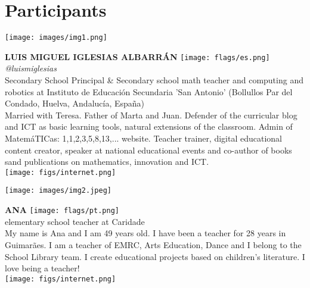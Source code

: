 \section*{Participants}
\noindent
\begin{minipage}{0.3\textwidth}
\centering
\texttt{[image: images/img1.png]}
\end{minipage}
\hfill
\begin{minipage}{0.6\textwidth}\raggedright
\color{color1}\uppercase{\textbf{Luis Miguel Iglesias Albarrán}}
\color{color2}\hspace{0.2cm}\texttt{[image: flags/es.png]}
\hspace{0.2cm}\textit{@luismiglesias}
\\
Secondary School Principal \& Secondary school math teacher and computing and robotics at Instituto de Educación Secundaria 'San Antonio' (Bollullos Par del Condado, Huelva, Andalucía, España)\\
{\footnotesize Married with Teresa. Father of Marta and Juan. Defender of the curricular blog and ICT as basic learning tools, natural extensions of the classroom. Admin of MatemáTICas: 1,1,2,3,5,8,13,... website. Teacher trainer, digital educational content creator, speaker at national educational events and co-author of books sand publications on mathematics, innovation and ICT.}\\
\texttt{[image: figs/internet.png]}
\end{minipage}
\newline\newline\newline

\noindent
\begin{minipage}{0.3\textwidth}
\centering
\texttt{[image: images/img2.jpeg]}
\end{minipage}
\hfill
\begin{minipage}{0.6\textwidth}\raggedright
\color{color1}\uppercase{\textbf{Ana }}
\color{color2}\hspace{0.2cm}\texttt{[image: flags/pt.png]}
\\
elementary school teacher at Caridade\\
{\footnotesize My name is Ana and I am 49 years old. I have been a teacher for 28 years in Guimarães. I am a teacher of EMRC, Arts Education, Dance and I belong to the School Library team. I create educational projects based on children's literature.
I love being a teacher!}\\
\texttt{[image: figs/internet.png]}
\end{minipage}
\newline\newline\newline

